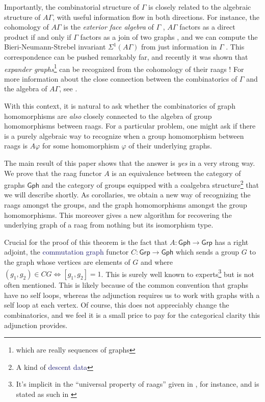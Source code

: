 \documentclass[12pt]{article}
\theoremstyle{definition}
\theoremstyle{theorem}
\newcommand*{\catFont}[1]{\mathsf{#1}}
\newcommand{\Grp}{\catFont{Grp}}
\newcommand*{\important}[1]{\textcolor{MidnightBlue}{#1}}
\begin{document}
  Importantly, the combinatorial structure of $\Gamma$ is closely related to the 
  algebraic structure of $A \Gamma$, with useful information flow in both directions. 
  For instance, the cohomology of $A \Gamma$ is the \emph{exterior face algebra} 
  of $\Gamma$ \cite{sabalkaRigidityIsomorphismProblem2009},
  $A\Gamma$ factors as a direct product if and only if $\Gamma$ factors
  as a join of two graphs \cite{servatiusAutomorphismsGraphGroups1989},
  and we can compute the Bieri-Neumann-Strebel invariant $\Sigma^1(A\Gamma)$
  from just information in $\Gamma$ \cite{meierBieriNeumannStrebelInvariantsGraph1995}.
  This correspondence can be pushed remarkably far, and recently it was
  shown that \emph{expander graphs}\footnote{which are really sequences of graphs}
  can be recognized from the cohomology of their raags
  \cite{floresExpandersRightangledArtin2021}! For more information about the 
  close connection between the combinatorics of $\Gamma$ and the algebra of
  $A\Gamma$, see 
  \cite{floresExpandersRightangledArtin2021, koberdaGeometryCombinatoricsRightAngled2022}.
  
  With this context, it is natural to ask whether the combinatorics
  of graph homomorphisms are \emph{also} closely connected to the algebra of
  group homomorphisms between raags. For a particular problem, one might ask 
  if there is a purely algebraic way to recognize when a group homomorphism 
  between raags is $A \varphi$ for some homomorphism $\varphi$ of their 
  underlying graphs.

  The main result of this paper shows
  that the answer is \emph{yes} in a very strong way. We prove that the raag 
  functor $A$ is an equivalence between the category of graphs $\mathsf{Gph}$ 
  and the category of groups equipped with a 
  coalgebra structure\footnote{A kind of \important{descent data}}
  that we will describe shortly. As corollaries, we obtain a new way of
  recognizing the raags amongst the groups, and the graph homomorphisms 
  amongst the group homomorphisms. This moreover gives a new algorithm for 
  recovering the underlying graph of a raag from nothing but its isomorphism 
  type.

  Crucial for the proof of this theorem is the fact that 
  $A : \mathsf{Gph} \to \Grp$ has a right adjoint, the \important{commutation graph}
  functor $C : \Grp \to \mathsf{Gph}$ which sends a group $G$ to the graph 
  whose vertices are elements of $G$ and where $(g_1,g_2) \in CG \iff [g_1,g_2]=1$. 
  This is surely well known to 
  experts\footnote{It's implicit in the ``universal property of raags'' given 
  in \cite{koberdaRIGHTANGLEDARTINGROUPS}, for instance, and is stated as
  such in \cite{servatiusAutomorphismsGraphGroups1989}} but is not often 
  mentioned. This is likely because of the common convention that graphs 
  have no self loops, whereas the adjunction requires us to work with graphs
  with a self loop at each vertex. Of course, this does not appreciably 
  change the combinatorics, and we feel it is a small price to pay for the 
  categorical clarity this adjunction provides.
\end{document}
